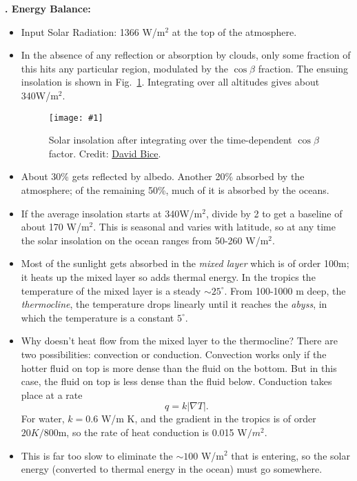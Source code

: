 \documentclass[11pt]{book}
\def\be{\begin{equation}}
\def\ee{\end{equation}}
\newcommand{\sfig}[2]{
\texttt{[image: \#1]}
        }
\newcommand{\Spng}[2]{
   \begin{figure}[thbp]
   \begin{center}
    \sfig{../Figures/#1.png}{0.7\columnwidth}
    \caption{{\small #2}}
    \label{fig:#1}
     \end{center}
   \end{figure}
}
\newcommand{\rf}[1]{\ref{fig:#1}}
\newcommand\bei{\begin{itemize}}
\newcommand\eei{\end{itemize}}
\newcounter{lectureno}
\newcounter{secno}
\newcommand\lsection[1]{
\addtocounter{secno}{1}
{\bf \arabic{lectureno}.\alph{secno} #1:}}
\begin{document}
\lsection{Energy Balance}
\bei
\item Input Solar Radiation: 1366 W/m$^2$ at the top of the atmosphere.
\item In the absence of any reflection or absorption by clouds, only some fraction of this hits any particular region, modulated by the $\cos\beta$ fraction. The ensuing insolation is shown in Fig.~\rf{davidbice}. Integrating over all altitudes gives about 340W/m$^2$. 
\Spng{davidbice}{Solar insolation after integrating over the time-dependent $\cos\beta$ factor. Credit: \href{https://www.e-education.psu.edu/earth103/node/1004}{David Bice}.}
\item About 30\% gets reflected by albedo. Another 20\% absorbed by the atmosphere; of the remaining 50\%, much of it is absorbed by the oceans.
\item If the average insolation starts at 340W/m$^2$, divide by 2 to get a baseline of about 170 W/m$^2$. This is seasonal and varies with latitude, so at any time the solar insolation on the ocean ranges from 50-260 W/m$^2$.
\item Most of the sunlight gets absorbed in the {\it mixed layer} which is of order 100m; it heats up the mixed layer so adds thermal energy. In the tropics the temperature of the mixed layer is a steady $\sim25^\circ$. From 100-1000 m deep, the {\it thermocline}, the temperature drops linearly until it reaches the {\it abyss}, in which the temperature is a constant $5^\circ$.
\item Why doesn't heat flow from the mixed layer to the thermocline? There are two possibilities: convection or conduction. Convection works only if the hotter fluid on top is more dense than the fluid on the bottom. But in this case, the fluid on top is less dense than the fluid below. Conduction takes place at a rate
\be
q=k|\nabla T|.\ee
For water, $k=0.6$ W/m K, and the gradient in the tropics is of order $20 K/800$m, so the rate of heat conduction is 0.015 W$/m^2$. 
\item This is far too slow to eliminate the $\sim100$ W/m$^2$ that is entering, so the solar energy (converted to thermal energy in the ocean) must go somewhere.
\eei
\end{document}
